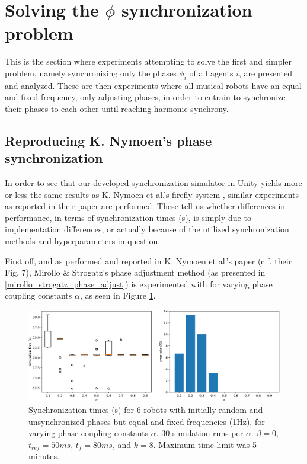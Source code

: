 \section{Solving the $\phi$ synchronization problem}
This is the section where experiments attempting to solve the first and simpler problem, namely synchronizing only the phases $\phi_i$ of all agents $i$, are presented and analyzed. These are then experiments where all musical robots have an equal and fixed frequency, only adjusting phases, in order to entrain to synchronize their phases to each other until reaching harmonic synchrony.
	
	\subsection{Reproducing K. Nymoen's phase synchronization}
	In order to see that our developed synchronization simulator in Unity yields more or less the same results as K. Nymoen et al.'s firefly system \cite{nymoen_synch}, similar experiments as reported in their paper are performed. These tell us whether differences in performance, in terms of synchronization times (s), is simply due to implementation differences, or actually because of the utilized synchronization methods and hyperparameters in question. 
	
	First off, and as performed and reported in K. Nymoen et al.'s paper \cite{nymoen_synch} (c.f. their Fig. 7), Mirollo \& Strogatz's phase adjustment method (as presented in \ref{mirollo_strogatz_phase_adjust}) is experimented with for varying phase coupling constants $\alpha$, as seen in Figure \ref{fig:exp1}.
	
	\begin{figure}[ht!]
		\centering
		\includegraphics[width=\linewidth]{Assets/DocSegments/Chapters/ExperimentsAndResults/Figures/PerfScores/experiment1_perfScores.pdf}
		\caption{Synchronization times (s) for 6 robots with initially random and unsynchronized phases but equal and fixed frequencies (1Hz), for varying phase coupling constants $\alpha$. 30 simulation runs per $\alpha$. $\beta=0$, $t_{ref}=50ms$, $t_f=80ms$, and $k=8$. Maximum time limit was 5 minutes.}
		\label{fig:exp1}
	\end{figure}
	

